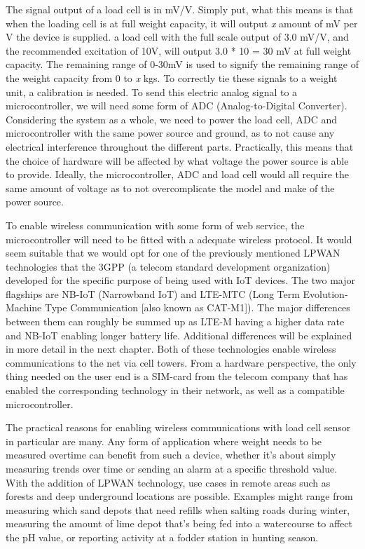 The signal output of a load cell is in mV/V\cite{load-cell-spec}. Simply put, what this means is that when the loading cell is at full weight capacity, it will output \textit{x} amount of mV per V the device is supplied. \eg a load cell with the full scale output of 3.0 mV/V, and the recommended excitation of 10V, will output 3.0 * 10 = 30 mV at full weight capacity. The remaining range of 0-30mV is used to signify the remaining range of the weight capacity from 0 to \textit{x} kgs. To correctly tie these signals to a weight unit, a calibration is needed. To send this electric analog signal to a microcontroller, we will need some form of ADC (Analog-to-Digital Converter). Considering the system as a whole, we need to power the load cell, ADC and microcontroller with the same power source and ground, as to not cause any electrical interference throughout the different parts. Practically, this means that the choice of hardware will be affected by what voltage the power source is able to provide. Ideally, the microcontroller, ADC and load cell would all require the same amount of voltage as to not overcomplicate the model and make of the power source.

To enable wireless communication with some form of web service, the microcontroller will need to be fitted with a adequate wireless protocol. It would seem suitable that we would opt for one of the previously mentioned LPWAN technologies that the 3GPP (a telecom standard development organization\cite{3gpp}) developed for the specific purpose of being used with IoT devices. The two major flagships are NB-IoT (Narrowband IoT) and LTE-MTC (Long Term Evolution-Machine Type Communication [also known as CAT-M1]). The major differences between them can roughly be summed up as LTE-M having a higher data rate and NB-IoT enabling longer battery life. Additional differences will be explained in more detail in the next chapter. Both of these technologies enable wireless communications to the net via cell towers. From a hardware perspective, the only thing needed on the user end is a SIM-card from the telecom company that has enabled the corresponding technology in their network, as well as a compatible microcontroller. 

The practical reasons for enabling wireless communications with load cell sensor in particular are many. Any form of application where weight needs to be measured overtime can benefit from such a device, whether it's about simply measuring trends over time or sending an alarm at a specific threshold value. With the addition of LPWAN technology, use cases in remote areas such as forests and deep underground locations are possible. Examples might range from measuring which sand depots that need refills when salting roads during winter, measuring the amount of lime depot that's being fed into a watercourse to affect the pH value, or reporting activity at a fodder station in hunting season. 


